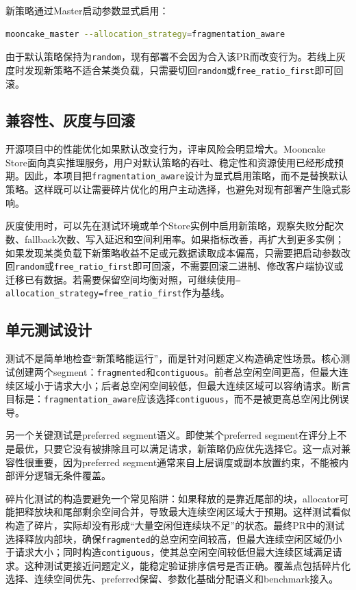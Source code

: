 \documentclass[UTF8,zihao=-4,a4paper]{ctexart}
\newcommand{\artifact}[1]{\texttt{#1}}
\newcommand{\strategy}{\texttt{fragmentation\_aware}}
\newcommand{\baseline}{\texttt{free\_ratio\_first}}
\begin{document}
新策略通过Master启动参数显式启用：

\begin{lstlisting}[language=bash]
mooncake_master --allocation_strategy=fragmentation_aware
\end{lstlisting}

由于默认策略保持为\artifact{random}，现有部署不会因为合入该PR而改变行为。若线上灰度时发现新策略不适合某类负载，只需要切回\artifact{random}或\baseline{}即可回滚。

\subsection{兼容性、灰度与回滚}

开源项目中的性能优化如果默认改变行为，评审风险会明显增大。Mooncake Store面向真实推理服务，用户对默认策略的吞吐、稳定性和资源使用已经形成预期。因此，本项目把\strategy{}设计为显式启用策略，而不是替换默认策略。这样既可以让需要碎片优化的用户主动选择，也避免对现有部署产生隐式影响。

灰度使用时，可以先在测试环境或单个Store实例中启用新策略，观察失败分配次数、fallback次数、写入延迟和空间利用率。如果指标改善，再扩大到更多实例；如果发现某类负载下新策略收益不足或元数据读取成本偏高，只需要把启动参数改回\artifact{random}或\baseline{}即可回滚，不需要回滚二进制、修改客户端协议或迁移已有数据。若需要保留空间均衡对照，可继续使用\artifact{--allocation\_strategy=free\_ratio\_first}作为基线。

\subsection{单元测试设计}

测试不是简单地检查“新策略能运行”，而是针对问题定义构造确定性场景。核心测试创建两个segment：\artifact{fragmented}和\artifact{contiguous}。前者总空闲空间更高，但最大连续区域小于请求大小；后者总空闲空间较低，但最大连续区域可以容纳请求。断言目标是：\strategy{}应该选择\artifact{contiguous}，而不是被更高总空闲比例误导。

另一个关键测试是preferred segment语义。即使某个preferred segment在评分上不是最优，只要它没有被排除且可以满足请求，新策略仍应优先选择它。这一点对兼容性很重要，因为preferred segment通常来自上层调度或副本放置约束，不能被内部评分逻辑无条件覆盖。

碎片化测试的构造要避免一个常见陷阱：如果释放的是靠近尾部的块，allocator可能把释放块和尾部剩余空间合并，导致最大连续空闲区域大于预期。这样测试看似构造了碎片，实际却没有形成“大量空闲但连续块不足”的状态。最终PR中的测试选择释放内部块，确保\artifact{fragmented}的总空闲空间较高，但最大连续空闲区域仍小于请求大小；同时构造\artifact{contiguous}，使其总空闲空间较低但最大连续区域满足请求。这种测试更接近问题定义，能稳定验证排序信号是否正确。覆盖点包括碎片化选择、连续空间优先、preferred保留、参数化基础分配语义和benchmark接入。
\end{document}
